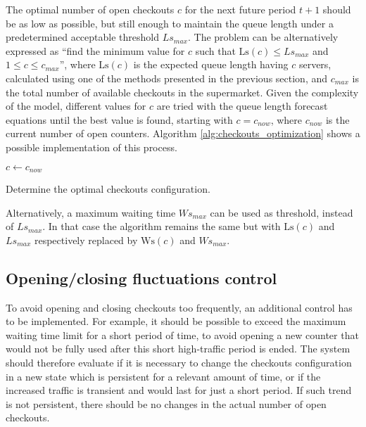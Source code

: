 The optimal number of open checkouts \( c \) for the next future period \( t+1 \) should be as low as possible, but still enough to maintain the queue length under a predetermined acceptable threshold \( Ls_{max} \). The problem can be alternatively expressed as “find the minimum value for \( c \) such that \( \text{Ls}(c) \leq Ls_{max} \) and \( 1 \leq c \leq c_{max} \)”, where \( \text{Ls}(c) \) is the expected queue length having \( c \) servers, calculated using one of the methods presented in the previous section, and \( c_{max} \) is the total number of available checkouts in the supermarket. Given the complexity of the model, different values for \( c \) are tried with the queue length forecast equations until the best value is found, starting with \( c = c_{now} \), where \( c_{now} \) is the current number of open counters. Algorithm \ref{alg:checkouts_optimization} shows a possible implementation of this process.
\begin{algorithm}
   \;
  $ c \gets c_{now}$\;
  \caption{\label{alg:checkouts_optimization}Determine the optimal checkouts configuration.}
\end{algorithm}

Alternatively, a maximum waiting time \( Ws_{max} \) can be used as threshold, instead of \( Ls_{max} \). In that case the algorithm remains the same but with \( \text{Ls}(c) \) and \( Ls_{max} \) respectively replaced by \( \text{Ws}(c) \) and \( Ws_{max} \).

\subsection{Opening/closing fluctuations control}
\label{subsec:opening_closing_fluctuations_control}

To avoid opening and closing checkouts too frequently, an additional control has to be implemented. For example, it should be possible to exceed the maximum waiting time limit for a short period of time, to avoid opening a new counter that would not be fully used after this short high-traffic period is ended. The system should therefore evaluate if it is necessary to change the checkouts configuration in a new state which is persistent for a relevant amount of time, or if the increased traffic is transient and would last for just a short period. If such trend is not persistent, there should be no changes in the actual number of open checkouts.

